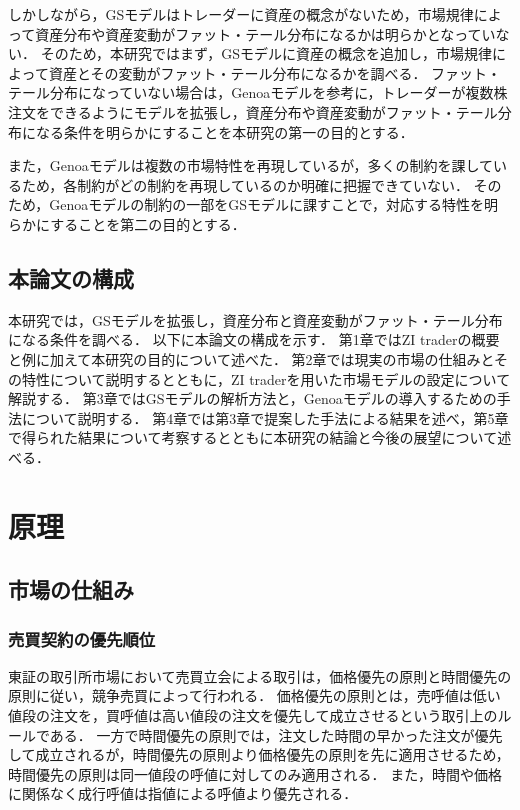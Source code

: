 \documentclass[titlepage]{jsreport}
\begin{document}
しかしながら，GSモデルはトレーダーに資産の概念がないため，市場規律によって資産分布や資産変動がファット・テール分布になるかは明らかとなっていない．
そのため，本研究ではまず，GSモデルに資産の概念を追加し，市場規律によって資産とその変動がファット・テール分布になるかを調べる．
ファット・テール分布になっていない場合は，Genoaモデルを参考に，トレーダーが複数株注文をできるようにモデルを拡張し，資産分布や資産変動がファット・テール分布になる条件を明らかにすることを本研究の第一の目的とする．

また，Genoaモデルは複数の市場特性を再現しているが，多くの制約を課しているため，各制約がどの制約を再現しているのか明確に把握できていない．
そのため，Genoaモデルの制約の一部をGSモデルに課すことで，対応する特性を明らかにすることを第二の目的とする．


\section{本論文の構成}
本研究では，GSモデルを拡張し，資産分布と資産変動がファット・テール分布になる条件を調べる．
以下に本論文の構成を示す．
第1章ではZI traderの概要と例に加えて本研究の目的について述べた．
第2章では現実の市場の仕組みとその特性について説明するとともに，ZI traderを用いた市場モデルの設定について解説する．
第3章ではGSモデルの解析方法と，Genoaモデルの導入するための手法について説明する．
第4章では第3章で提案した手法による結果を述べ，第5章で得られた結果について考察するとともに本研究の結論と今後の展望について述べる．

\chapter{原理} \label{chap:principle}

\section{市場の仕組み}
\subsection{売買契約の優先順位}
東証の取引所市場において売買立会による取引は，価格優先の原則と時間優先の原則に従い，競争売買によって行われる\cite{shokengaimuin}．
価格優先の原則とは，売呼値は低い値段の注文を，買呼値は高い値段の注文を優先して成立させるという取引上のルールである．
一方で時間優先の原則では，注文した時間の早かった注文が優先して成立されるが，時間優先の原則より価格優先の原則を先に適用させるため，時間優先の原則は同一値段の呼値に対してのみ適用される．
また，時間や価格に関係なく成行呼値は指値による呼値より優先される．
\end{document}

